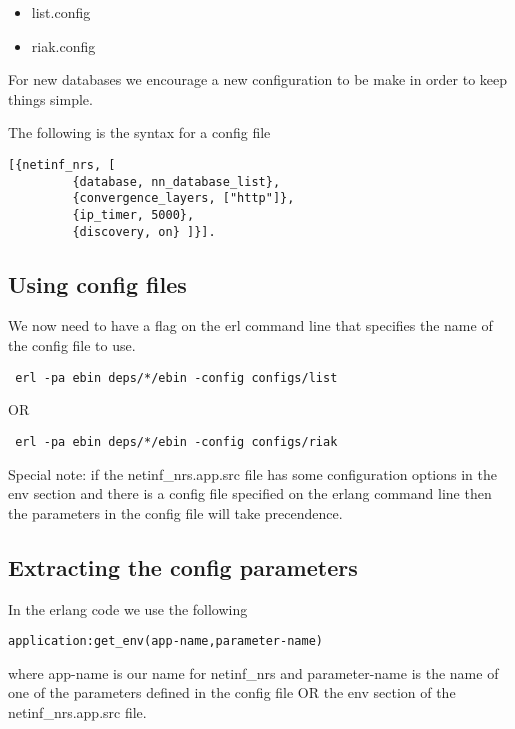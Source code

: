 \documentclass[11pt]{report}
\begin{document}
\begin {itemize}
\item list.config
\item riak.config
\end {itemize}

For new databases we encourage a new configuration to be make in order to keep things simple.


The following is the syntax for a config file 

\begin {verbatim}
[{netinf_nrs, [ 
	     {database, nn_database_list},
	     {convergence_layers, ["http"]},
	     {ip_timer, 5000},
	     {discovery, on} ]}].

\end{verbatim}

\subsection {Using config files}

We now need to have a flag on the erl command line that specifies the name of the config file to use. 

\begin {verbatim}
 erl -pa ebin deps/*/ebin -config configs/list
\end{verbatim}

OR

\begin {verbatim}
 erl -pa ebin deps/*/ebin -config configs/riak
\end{verbatim}

Special note: if the netinf\_nrs.app.src file has some configuration options in the env section and there is a config file specified on the erlang command line then the parameters in the config file  will take precendence.

\subsection {Extracting the config parameters}

In the erlang code we use the following 

\begin {verbatim}
application:get_env(app-name,parameter-name) 
\end{verbatim}

where app-name is our name for netinf\_nrs and parameter-name is the name of one of the parameters defined in the config file OR the env section of the netinf\_nrs.app.src file.
\end{document}
